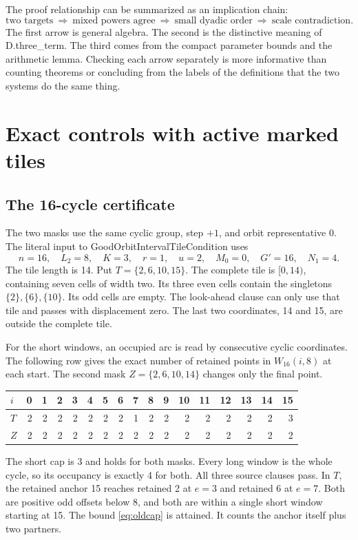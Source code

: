 \documentclass[12pt,letterpaper]{article}
\DeclareRobustCommand{\id}[1]{\mbox{\small\ttfamily #1}}
\begin{document}
The proof relationship can be summarized as an implication chain:
\[
 \text{two targets}\ \Longrightarrow\
 \text{mixed powers agree}\ \Longrightarrow\
 \text{small dyadic order}\ \Longrightarrow\
 \text{scale contradiction}.
\]
The first arrow is general algebra. The second is the distinctive meaning of \id{D.three\_term}. The third comes from the compact parameter bounds and the arithmetic lemma. Checking each arrow separately is more informative than counting theorems or concluding from the labels of the definitions that the two systems do the same thing.

\section{Exact controls with active marked tiles}
\label{sec:controls}

\subsection{The 16-cycle certificate}

The two masks use the same cyclic group, step $+1$, and orbit representative $0$. The literal input to \id{GoodOrbitIntervalTileCondition} uses
\[
 n=16,\quad L_2=8,\quad K=3,\quad r=1,\quad u=2,\quad
 M_0=0,\quad G'=16,\quad N_1=4 .
\]
The tile length is 14. Put $T=\{2,6,10,15\}$. The complete tile is $[0,14)$, containing seven cells of width two. Its three even cells contain the singletons $\{2\},\{6\},\{10\}$. Its odd cells are empty. The look-ahead clause can only use that tile and passes with displacement zero. The last two coordinates, 14 and 15, are outside the complete tile.

For the short windows, an occupied arc is read by consecutive cyclic coordinates. The following row gives the exact number of retained points in $W_{16}(i,8)$ at each start. The second mask $Z=\{2,6,10,14\}$ changes only the final point.
\begin{center}
\small
\begin{tabular}{@{}l*{16}{r}@{}}
\toprule
$i$&0&1&2&3&4&5&6&7&8&9&10&11&12&13&14&15\\
\midrule
$T$&2&2&2&2&2&2&2&1&2&2&2&2&2&2&2&3\\
$Z$&2&2&2&2&2&2&2&2&2&2&2&2&2&2&2&2\\
\bottomrule
\end{tabular}
\end{center}
The short cap is 3 and holds for both masks. Every long window is the whole cycle, so its occupancy is exactly 4 for both. All three source clauses pass. In $T$, the retained anchor 15 reaches retained 2 at $e=3$ and retained 6 at $e=7$. Both are positive odd offsets below 8, and both are within a single short window starting at 15. The bound \eqref{eq:oldcap} is attained. It counts the anchor itself plus two partners.
\end{document}
